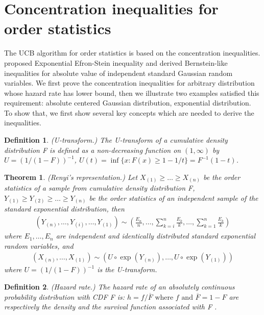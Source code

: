 \documentclass{article}
\theoremstyle{plain}
\newtheorem{theo}{Theorem}
\newtheorem{defi}{Definition}
\begin{document}
\section{Concentration inequalities for order statistics}
The UCB algorithm for order statistics is based on the concentration inequalities. \cite{boucheron2012} proposed Exponential Efron-Stein inequality and derived Bernstein-like inequalities for absolute value of independent standard Gaussian random variables. We first prove the concentration inequalities for arbitrary distribution whose hazard rate has lower bound, then we illustrate two examples satisfied this requirement: absolute centered Gaussian distribution, exponential distribution. To show that, we first show several key concepts which are needed to derive the inequalities. 


\begin{defi} (U-transform.) 
\label{defi: U-transform}
The U-transform of a cumulative density distribution F is defined as a non-decreasing function on $(1, \infty)$ by $U = (1/(1-F))^{-1}$, $U(t) = \inf\{x: F(x) \geq 1 - 1/t\} = F^{-1}(1-t)$.
\end{defi}

\begin{theo} (Renyi's representation.) Let $X_{(1)} \geq \ldots \geq X_{(n)}$ be the order statistics of a sample from cumulative density distribution F, $Y_{(1)} \geq Y_{(2)} \geq \ldots \geq Y_{(n)}$ be the
order statistics of an independent sample of the standard exponential distribution, then
\begin{align}
    \left(Y_{(n)}, \ldots, Y_{(i)}, \ldots, Y_{(1)}\right) \sim\left(\frac{E_{n}}{n}, \ldots, \sum_{k=i}^{n} \frac{E_{k}}{k}, \ldots, \sum_{k=1}^{n} \frac{E_{k}}{k}\right)
\end{align}
where $E_{1}, \ldots, E_{n}$ are independent and identically distributed standard exponential random variables, and
\begin{align}
    \left(X_{(n)}, \ldots, X_{(1)}\right) \sim\left(U \circ \exp \left(Y_{(n)}\right), \ldots, U \circ \exp \left(Y_{(1)}\right)\right)
\end{align}
where $U=(1 /(1-F))^{-1}$ is the U-transform.
\end{theo}

\begin{defi} (Hazard rate.) The hazard rate of an absolutely continuous probability distribution with CDF F is: $h=f / \overline{F} \text { where } f \text { and } \overline{F}=1-F$ are respectively the density and the survival function associated with F .
\end{defi}
\end{document}
